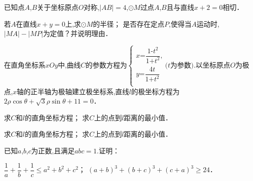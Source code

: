 \documentclass[windows,list]{BHCexam}
\begin{document}
\begin{groups}
\begin{questions}[t]
\begin{minipage}{\linewidth}
\begin{solution}{6cm}
\end{solution}
\end{minipage}
\vfill
\begin{minipage}{\linewidth}
\question[12] 已知点$A$,$B$关于坐标原点$O$对称,$|AB|=4$,$ \odot M$过点$A$,$B$且与直线$x+2=0$相切．
\begin{subquestions}
    \subquestion 若$A$在直线$x+y=0$上,求$ \odot M$的半径； 
    \subquestion 是否存在定点$P$,使得当$A$运动时,$|MA|-|MP|$为定值？并说明理由．
\end{subquestions}
\begin{solution}{6cm}
\end{solution}
\end{minipage}
\vfill
\begin{minipage}{\linewidth}
\question[10] 在直角坐标系$xOy$中,曲线$C$的参数方程为$\begin{cases} x\text{=}\dfrac{1\text{-}t^{2}}{1\text{+}t^{2}}\text{,} \\ y\text{=}\dfrac{4t}{1\text{+}t^{2}} \\ \end{cases} (t$为参数$).$以坐标原点$O$为极点,$x$轴的正半轴为极轴建立极坐标系,直线$l$的极坐标方程为$2 \rho \cos \theta + \sqrt{3}  \rho \sin \theta +11=0$．
\begin{subquestions}
    \subquestion 求$C$和$l$的直角坐标方程； 
    \subquestion 求$C$上的点到$l$距离的最小值．
	\begin{subquestions}
		\subquestion 求$C$和$l$的直角坐标方程； 
		\subquestion 求$C$上的点到$l$距离的最小值．
		
	\end{subquestions}
\end{subquestions}
\begin{solution}{6cm}

\end{solution}
\end{minipage}
\vfill
\begin{minipage}{\linewidth}
\question[12] 已知$a$,$b$,$c$为正数,且满足$abc=1.$证明： 
\begin{subquestions}
    \subquestion $\dfrac{1}{a} + \dfrac{1}{b} + \dfrac{1}{c} \leqslant a ^{2} +b ^{2} +c ^{2}$； 
    \subquestion $(a+b) ^{3} +(b+c) ^{3} +(c+a) ^{3} \geqslant 24$．
\end{subquestions}
\begin{solution}{6cm}

\end{solution}
\end{minipage}
\vfill
\end{questions}
\end{groups}
\label{lastpage}
\end{document}
